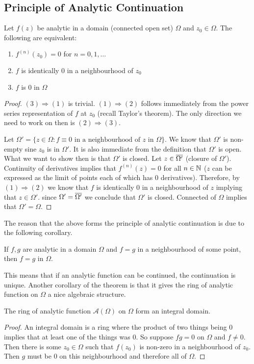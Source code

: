 \subsection{Principle of Analytic Continuation}
\begin{theorem}
Let $f(z)$ be analytic in a domain (connected open set) $\Omega$ and $z_0 \in \Omega$. The following are equivalent:
\begin{enumerate}
    \item $f^{(n)}(z_0) = 0$ for $n = 0, 1, \dots$
    \item $f$ is identically 0 in a neighbourhood of $z_0$
    \item $f$ is 0 in $\Omega$
\end{enumerate}
\end{theorem}
\begin{proof}
$(3) \Rightarrow (1)$ is trivial. $(1) \Rightarrow (2)$ follows immediately from the power series representation of $f$ at $z_0$ (recall Taylor's theorem). The only direction we need to work on then is $(2) \Rightarrow (3)$.

Let $\Omega' = \{z \in \Omega : f \equiv 0 \text{ in a neighbourhood of $z$ in } \Omega\}$. We know that $\Omega'$ is non-empty sine $z_0$ is in $\Omega'$. It is also immediate from the definition that $\Omega'$ is open. What we want to show then is that $\Omega'$ is closed. Let $z \in \overline{\Omega'}$ (closure of $\Omega'$). Continuity of derivatives implies that $f^{(n)}(z) = 0$ for all $n \in \mathbb{N}$ ($z$ can be expressed as the limit of points each of which has 0 derivatives). Therefore, by $(1) \Rightarrow (2)$ we know that $f$ is identically 0 in a neighbourhood of $z$ implying that $z \in \Omega'$. since $\Omega' = \overline{\Omega'}$ we conclude that $\Omega'$ is closed. Connected of $\Omega$ implies that $\Omega' = \Omega$.
\end{proof}

The reason that the above forms the principle of analytic continuation is due to the following corollary.
\begin{corollary}
If $f, g$ are analytic in a domain $\Omega$ and $f = g$ in a neighbourhood of some point, then $f = g$ in $\Omega$.
\end{corollary}
This means that if an analytic function can be continued, the continuation is unique. Another corollary of the theorem is that it gives the ring of analytic function on $\Omega$ a nice algebraic structure.
\begin{corollary}
The ring of analytic function $\mathscr{A}(\Omega)$ on $\Omega$ form an integral domain.
\end{corollary}
\begin{proof}
An integral domain is a ring where the product of two things being 0 implies that at least one of the things was 0. So suppose $fg = 0$ on $\Omega$ and $f \neq 0$. Then there is some $z_0 \in \Omega$ such that $f(z_0)$ is non-zero in a neighbourhood of $z_0$. Then $g$ must be 0 on this neighbourhood and therefore all of $\Omega$. 
\end{proof}

